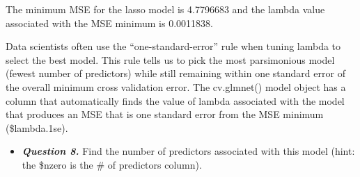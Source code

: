 \documentclass[
]{article}
\newenvironment{Shaded}{\begin{snugshade}}{\end{snugshade}}
\newcommand{\CommentTok}[1]{\textcolor[rgb]{0.56,0.35,0.01}{\textit{#1}}}
\newcommand{\FloatTok}[1]{\textcolor[rgb]{0.00,0.00,0.81}{#1}}
\newcommand{\FunctionTok}[1]{\textcolor[rgb]{0.13,0.29,0.53}{\textbf{#1}}}
\newcommand{\NormalTok}[1]{#1}
\newcommand{\OtherTok}[1]{\textcolor[rgb]{0.56,0.35,0.01}{#1}}
\newcommand{\SpecialCharTok}[1]{\textcolor[rgb]{0.81,0.36,0.00}{\textbf{#1}}}
\providecommand{\tightlist}{%
  \setlength{\itemsep}{0pt}\setlength{\parskip}{0pt}}
\begin{document}
\begin{Shaded}
\end{Shaded}

The minimum MSE for the lasso model is 4.7796683 and the lambda value
associated with the MSE minimum is 0.0011838.

Data scientists often use the ``one-standard-error'' rule when tuning
lambda to select the best model. This rule tells us to pick the most
parsimonious model (fewest number of predictors) while still remaining
within one standard error of the overall minimum cross validation error.
The cv.glmnet() model object has a column that automatically finds the
value of lambda associated with the model that produces an MSE that is
one standard error from the MSE minimum (\$lambda.1se).

\begin{itemize}
\tightlist
\item
  \textbf{\emph{Question 8.}} Find the number of predictors associated
  with this model (hint: the \$nzero is the \# of predictors column).
\end{itemize}

\begin{Shaded}
\end{Shaded}
\end{document}
